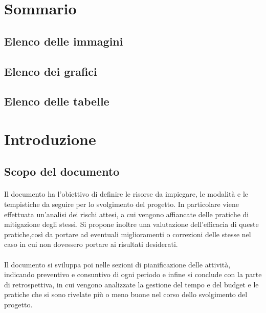\documentclass[10pt, a4paper]{article}
\title{\titolo}
\author{SWEetCode}
\begin{document}



\newpage

\tableofcontents
\section*{Sommario}
\subsection*{Elenco delle immagini}
\subsection*{Elenco dei grafici}
\subsection*{Elenco delle tabelle}
\newpage


\section{Introduzione}



\subsection{Scopo del documento}
\paragraph{}Il documento ha l'obiettivo di definire le risorse da impiegare, le modalità e le tempistiche da seguire per lo svolgimento del progetto. In particolare viene effettuata un'analisi dei rischi attesi, a cui vengono affiancate delle pratiche di mitigazione degli stessi. Si propone inoltre una valutazione dell'efficacia di queste pratiche,così da portare ad eventuali miglioramenti o correzioni delle stesse nel caso in cui non dovessero portare ai risultati desiderati.
\paragraph{}Il documento si sviluppa poi nelle sezioni di pianificazione delle attività, indicando preventivo e consuntivo di ogni periodo e infine si conclude con la parte di retrospettiva, in cui vengono analizzate la gestione del tempo e del budget e le pratiche che si sono rivelate più o meno buone nel corso dello svolgimento del progetto.
\end{document}
